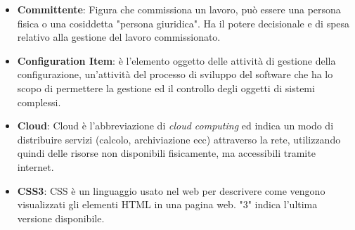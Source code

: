 \documentclass[a4paper, oneside, openany]{article}
\begin{document}
\begin{itemize}
\item \textbf{Committente}: Figura che commissiona un lavoro, può essere una persona fisica o una cosiddetta "persona giuridica". Ha il potere decisionale e di spesa relativo alla gestione del lavoro commissionato.
\item \textbf{Configuration Item}: è l'elemento oggetto delle attività di gestione della configurazione, un'attività del processo di sviluppo del software che ha lo scopo di permettere la gestione ed il controllo degli oggetti di sistemi complessi.
\item \textbf{Cloud}: Cloud è l'abbreviazione di \textit{cloud computing} ed indica un modo di distribuire servizi (calcolo, archiviazione ecc) attraverso la rete, utilizzando quindi delle risorse non disponibili fisicamente, ma accessibili tramite internet.
\item \textbf{CSS3}: CSS è un linguaggio usato nel web per descrivere come vengono visualizzati gli elementi HTML in una pagina web. "3" indica l'ultima versione disponibile.
\end{itemize}
\end{document}
